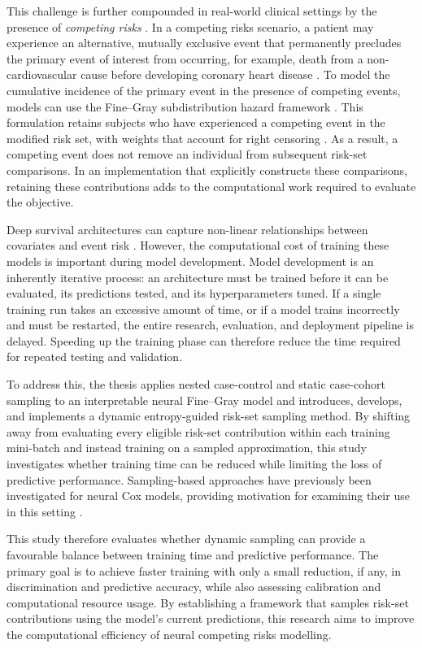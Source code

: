 \documentclass[a4paper,twoside,12pt]{report}
\begin{document}
This challenge is further compounded in real-world clinical settings by the presence of \textit{competing risks} \citep{latouche2013competing}. In a competing risks scenario, a patient may experience an alternative, mutually exclusive event that permanently precludes the primary event of interest from occurring, for example, death from a non-cardiovascular cause before developing coronary heart disease \citep{andersen2012competing}. To model the cumulative incidence of the primary event in the presence of competing events, models can use the Fine--Gray subdistribution hazard framework \citep{FineGray1999}. This formulation retains subjects who have experienced a competing event in the modified risk set, with weights that account for right censoring \citep{FineGray1999}. As a result, a competing event does not remove an individual from subsequent risk-set comparisons. In an implementation that explicitly constructs these comparisons, retaining these contributions adds to the computational work required to evaluate the objective.

Deep survival architectures can capture non-linear relationships between covariates and event risk \citep{kvamme2019}. However, the computational cost of training these models is important during model development. Model development is an inherently iterative process: an architecture must be trained before it can be evaluated, its predictions tested, and its hyperparameters tuned. If a single training run takes an excessive amount of time, or if a model trains incorrectly and must be restarted, the entire research, evaluation, and deployment pipeline is delayed. Speeding up the training phase can therefore reduce the time required for repeated testing and validation.

To address this, the thesis applies nested case-control and static case-cohort sampling to an interpretable neural Fine--Gray model and introduces, develops, and implements a dynamic entropy-guided risk-set sampling method. By shifting away from evaluating every eligible risk-set contribution within each training mini-batch and instead training on a sampled approximation, this study investigates whether training time can be reduced while limiting the loss of predictive performance. Sampling-based approaches have previously been investigated for neural Cox models, providing motivation for examining their use in this setting \citep{kvamme2019}.

This study therefore evaluates whether dynamic sampling can provide a favourable balance between training time and predictive performance. The primary goal is to achieve faster training with only a small reduction, if any, in discrimination and predictive accuracy, while also assessing calibration and computational resource usage. By establishing a framework that samples risk-set contributions using the model's current predictions, this research aims to improve the computational efficiency of neural competing risks modelling.
\end{document}
